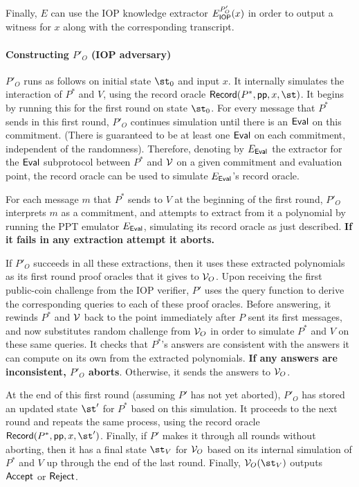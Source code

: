 Finally, $E$ can use the IOP knowledge extractor $E_{\textsf{{IOP}}}^{P'_O}(x)$ in order to output a witness for $x$ along with the corresponding transcript. 

\paragraph{Constructing $P'_O$ (IOP adversary)}
$P'_O$ runs as follows on initial state $\st_0$ and input $x$. It internally simulates the interaction of $P^*$ and $V$, using the record oracle $\pro{Record}(P^*, \params, x, \st)$. It begins by running this for the first round on state $\st_0$. For every message that $P^*$ sends in this first round, $P'_O$ continues simulation until there is an $\textsf{{Eval}}$ on this commitment. (There is guaranteed to be at least one $\textsf{{Eval}}$ on each commitment, independent of the randomness). Therefore, denoting by $E_\textsf{{Eval}}$ the extractor for the $\textsf{{Eval}}$ subprotocol between $P^*$ and $\mathcal{V}$ on a given commitment and evaluation point, the record oracle can be used to simulate $E_\textsf{{Eval}}$'s record oracle.%

For each message $m$ that $P^*$ sends to $V$ at the beginning of the first round, $P'_O$ interprets $m$ as a commitment, and attempts to extract from it a polynomial by 
running the PPT emulator $E_\textsf{{Eval}}$, simulating its record oracle as just described. \textbf{If it fails in any extraction attempt it aborts.} 

If $P'_O$ succeeds in all these extractions, then it uses these extracted polynomials as its first round proof oracles that it gives to $\mathcal{V}_O$. Upon receiving the first public-coin challenge from the IOP verifier, $P'$ uses the query function to derive the corresponding queries to each of these proof oracles. Before answering, it rewinds $P^*$ and $\mathcal{V}$ back to the point immediately after $P$ sent its first messages, and now substitutes random challenge from $\mathcal{V}_O$ in order to simulate $P^*$ and $V$ on these same queries. It checks that $P^*$'s answers are consistent with the answers it can compute on its own from the extracted polynomials. \textbf{If any answers are inconsistent, $P'_O$ aborts}. Otherwise, it sends the answers to $\mathcal{V}_O$. 

At the end of this first round (assuming $P'$ has not yet aborted), $P'_O$ has stored an updated state $\st'$ for $P^*$ based on this simulation. It proceeds to the next round and repeats the same process, using the record oracle $\pro{Record}(P^*, \params, x, \st')$. Finally, if $P'$ makes it through all rounds without aborting, then it has a final state $\st_V$ for $\mathcal{V}_O$ based on its internal simulation of $P^*$ and $V$ up through the end of the last round. Finally, $\verifier_O(\st_V)$ outputs $\textsf{{Accept}}$ or $\textsf{{Reject}}$. %

